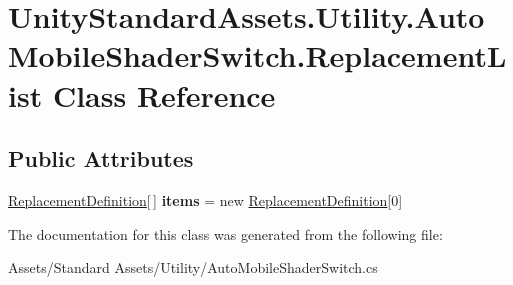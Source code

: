 \hypertarget{class_unity_standard_assets_1_1_utility_1_1_auto_mobile_shader_switch_1_1_replacement_list}{}\section{Unity\+Standard\+Assets.\+Utility.\+Auto\+Mobile\+Shader\+Switch.\+Replacement\+List Class Reference}
\label{class_unity_standard_assets_1_1_utility_1_1_auto_mobile_shader_switch_1_1_replacement_list}
\subsection*{Public Attributes}
\begin{DoxyCompactItemize}
\item 
\hyperlink{class_unity_standard_assets_1_1_utility_1_1_auto_mobile_shader_switch_1_1_replacement_definition}{Replacement\+Definition}\mbox{[}$\,$\mbox{]} {\bfseries items} = new \hyperlink{class_unity_standard_assets_1_1_utility_1_1_auto_mobile_shader_switch_1_1_replacement_definition}{Replacement\+Definition}\mbox{[}0\mbox{]}\hypertarget{class_unity_standard_assets_1_1_utility_1_1_auto_mobile_shader_switch_1_1_replacement_list_a66f83004343262d054bd122a2ea6cb9f}{}\label{class_unity_standard_assets_1_1_utility_1_1_auto_mobile_shader_switch_1_1_replacement_list_a66f83004343262d054bd122a2ea6cb9f}

\end{DoxyCompactItemize}


The documentation for this class was generated from the following file\+:\begin{DoxyCompactItemize}
\item 
Assets/\+Standard Assets/\+Utility/Auto\+Mobile\+Shader\+Switch.\+cs\end{DoxyCompactItemize}
